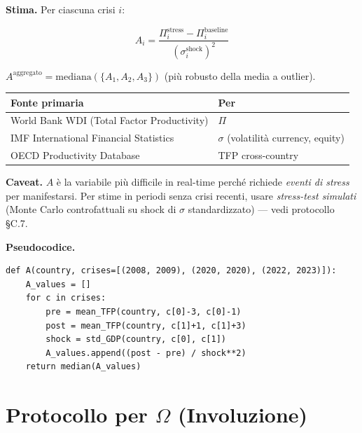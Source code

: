\Hypoth{} \textbf{Stima.} Per ciascuna crisi \(i\):

\[
A_i = \frac{\Pi^{\text{stress}}_i - \Pi^{\text{baseline}}_i}{(\sigma^{\text{shock}}_i)^2}
\]

\(A^{\text{aggregato}} = \text{mediana}(\{A_1, A_2, A_3\})\) (più
robusto della media a outlier).

{\def\LTcaptype{none} %
{\small\begin{longtable}[]{@{}
  >{\raggedright\arraybackslash}p{}
  >{\raggedright\arraybackslash}p{}@{}}
\toprule\noalign{}
\begin{minipage}[b]{\linewidth}\raggedright
Fonte primaria
\end{minipage} & \begin{minipage}[b]{\linewidth}\raggedright
Per
\end{minipage} \\
\midrule\noalign{}
\endhead
\bottomrule\noalign{}
\endlastfoot
World Bank WDI (Total Factor Productivity) & \(\Pi\) \\
IMF International Financial Statistics & \(\sigma\) (volatilità
currency, equity) \\
OECD Productivity Database & TFP cross-country \\
\end{longtable}}
}

\Conj{} \textbf{Caveat.} \(A\) è la variabile più difficile in real-time
perché richiede \emph{eventi di stress} per manifestarsi. Per stime in
periodi senza crisi recenti, usare \emph{stress-test simulati} (Monte
Carlo controfattuali su shock di \(\sigma\) standardizzato) --- vedi
protocollo \S{}C.7.

\Hypoth{} \textbf{Pseudocodice.}

\begin{verbatim}
def A(country, crises=[(2008, 2009), (2020, 2020), (2022, 2023)]):
    A_values = []
    for c in crises:
        pre = mean_TFP(country, c[0]-3, c[0]-1)
        post = mean_TFP(country, c[1]+1, c[1]+3)
        shock = std_GDP(country, c[0], c[1])
        A_values.append((post - pre) / shock**2)
    return median(A_values)
\end{verbatim}



\section{\texorpdfstring{Protocollo per \(\Omega\)
(Involuzione)}{Protocollo per \textbackslash Omega (Involuzione)}}\label{protocollo-per-omega-involuzione}

